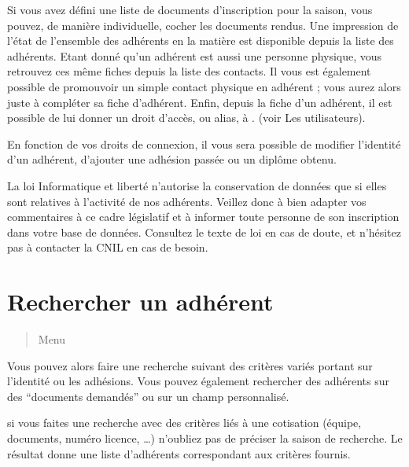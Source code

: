 \documentclass[a4paper,10pt,oneside,french]{sphinxmanual}
\begin{document}
\sphinxAtStartPar
Si vous avez défini une liste de documents d’inscription pour la saison, vous pouvez, de manière individuelle, cocher les documents rendus. Une impression de l’état de l’ensemble des adhérents en la matière est disponible depuis la liste des adhérents.
Etant donné qu’un adhérent est aussi une personne physique, vous retrouvez ces même fiches depuis la liste des contacts. Il vous est également possible de promouvoir un simple contact physique en adhérent ; vous aurez alors juste à compléter sa fiche d’adhérent.
Enfin, depuis la fiche d’un adhérent, il est possible de lui donner un droit d’accès, ou alias, à . (voir Les utilisateurs).

\sphinxAtStartPar
En fonction de vos droits de connexion, il vous sera possible de modifier l’identité d’un adhérent, d’ajouter une adhésion passée ou un diplôme obtenu.

\noindent{}

\sphinxAtStartPar
{} La loi Informatique et liberté n’autorise la conservation de données que si elles sont relatives à l’activité de nos adhérents. Veillez donc à bien adapter vos commentaires à ce cadre législatif et à informer toute personne de son inscription dans votre base de données.
Consultez le texte de loi en cas de doute, et n’hésitez pas à contacter la CNIL en cas de besoin.


\section{Rechercher un adhérent}
\label{\detokenize{member/member_search:rechercher-un-adherent}}\label{\detokenize{member/member_search::doc}}\begin{quote}

\sphinxAtStartPar
Menu 
\end{quote}

\noindent{}

\sphinxAtStartPar
Vous pouvez alors faire une recherche suivant des critères variés portant sur l’identité ou les adhésions.
Vous pouvez également rechercher des adhérents sur des “documents demandés” ou sur un champ personnalisé.

\sphinxAtStartPar
{} si vous faites une recherche avec des critères liés à une cotisation (équipe, documents, numéro licence, …) n’oubliez pas de préciser la saison de recherche. Le résultat donne une liste d’adhérents correspondant aux critères fournis.
\end{document}
